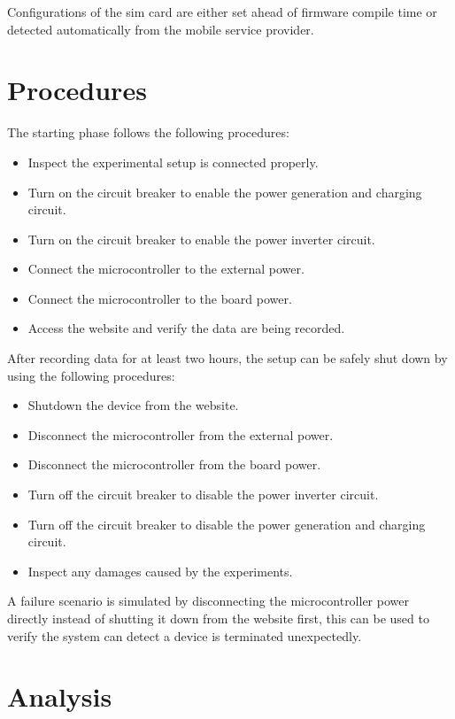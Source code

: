 \documentclass[../thesis.tex]{subfiles}
\begin{document}
Configurations of the sim card are either set ahead of firmware compile time or detected automatically from the mobile service provider.


\section{Procedures} %

The starting phase follows the following procedures:

\begin{itemize}
\item Inspect the experimental setup is connected properly.
\item Turn on the circuit breaker to enable the power generation and charging circuit.
\item Turn on the circuit breaker to enable the power inverter circuit.
\item Connect the microcontroller to the external power.
\item Connect the microcontroller to the board power.
\item Access the website and verify the data are being recorded.
\end{itemize}

After recording data for at least two hours, the setup can be safely shut down by using the following procedures:

\begin{itemize}
\item Shutdown the device from the website.
\item Disconnect the microcontroller from the external power.
\item Disconnect the microcontroller from the board power.
\item Turn off the circuit breaker to disable the power inverter circuit.
\item Turn off the circuit breaker to disable the power generation and charging circuit.
\item Inspect any damages caused by the experiments.
\end{itemize}

A failure scenario is simulated by disconnecting the microcontroller power directly instead of shutting it down from the website first, this can be used to verify the system can detect a device is terminated unexpectedly.

\section{Analysis}
\end{document}
